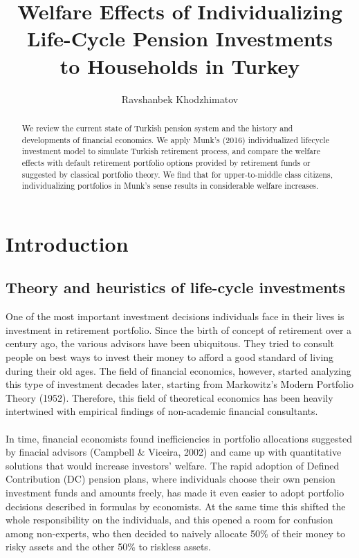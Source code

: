 \documentclass[]{article}
\author{Ravshanbek Khodzhimatov}
\title{Welfare Effects of Individualizing Life-Cycle Pension Investments\\to Households in Turkey}
\begin{document}
\maketitle

\begin{abstract}
\vspace{20pt}
We review the current state of Turkish pension system and the history and developments of financial economics. We apply Munk's (2016) individualized lifecycle investment model to simulate Turkish retirement process, and compare the welfare effects with default retirement portfolio options provided by retirement funds or suggested by classical portfolio theory. We find that for upper-to-middle class citizens, individualizing portfolios in Munk's sense results in considerable welfare increases. 
\end{abstract}


\section{Introduction} %
\label{intro} %


\subsection{Theory and heuristics of life-cycle investments}
One of the most important investment decisions individuals face in their lives is investment in retirement portfolio. Since the birth of concept of retirement over a century ago, the various advisors have been ubiquitous. They tried to consult people on best ways to invest their money to afford a good standard of living during their old ages. The field of financial economics, however, started analyzing this type of investment decades later, starting from Markowitz's Modern Portfolio Theory (1952). Therefore, this field of theoretical economics has been heavily intertwined with empirical findings of non-academic financial consultants.
\paragraph*{}
In time, financial economists found inefficiencies in portfolio allocations suggested by finacial advisors (Campbell \& Viceira, 2002) and came up with quantitative solutions that would increase investors' welfare. The rapid adoption of Defined Contribution (DC) pension plans, where individuals choose their own pension investment funds and amounts freely, has made it even easier to adopt portfolio decisions described in formulas by economists. At the same time this shifted the whole responsibility on the individuals, and this opened a room for confusion among non-experts, who then decided to naively allocate 50\% of their money to risky assets and the other 50\% to riskless assets.
\end{document}
